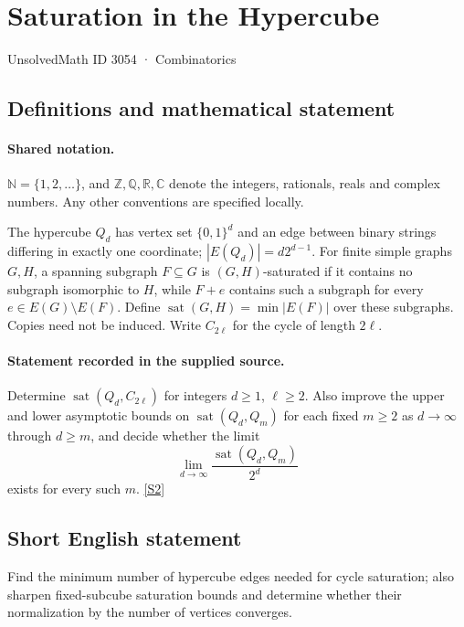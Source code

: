 \documentclass[11pt]{book}
\newcommand{\sref}[2]{\hyperlink{source:#1:#2}{[S#2]}}
\begin{document}
\setcounter{section}{3053}
\section{Saturation in the Hypercube}\label{3054}
{\small\sffamily UnsolvedMath ID 3054 · Combinatorics}
\subsection{Definitions and mathematical statement}

\paragraph{Shared notation.}$\mathbb N=\{1,2,\ldots\}$, and $\mathbb Z,\mathbb Q,\mathbb R,\mathbb C$ denote the integers, rationals, reals and complex numbers. Any other conventions are specified locally.


The hypercube $Q_d$ has vertex set $\{0,1\}^d$ and an edge between binary strings differing in exactly one coordinate; $|E(Q_d)|=d2^{d-1}$. For finite simple graphs $G,H$, a spanning subgraph $F\subseteq G$ is $(G,H)$-saturated if it contains no subgraph isomorphic to $H$, while $F+e$ contains such a subgraph for every $e\in E(G)\setminus E(F)$. Define $\operatorname{sat}(G,H)=\min |E(F)|$ over these subgraphs. Copies need not be induced. Write $C_{2\ell}$ for the cycle of length $2\ell$.
\paragraph{Statement recorded in the supplied source.}
Determine $\operatorname{sat}(Q_d,C_{2\ell})$ for integers $d\geq1$, $\ell\geq2$. Also improve the upper and lower asymptotic bounds on $\operatorname{sat}(Q_d,Q_m)$ for each fixed $m\geq2$ as $d\to\infty$ through $d\geq m$, and decide whether the limit
\[\lim_{d\to\infty}\frac{\operatorname{sat}(Q_d,Q_m)}{2^d}\]
exists for every such $m$. \sref{3054}{2}
\subsection{Short English statement}
Find the minimum number of hypercube edges needed for cycle saturation; also sharpen fixed-subcube saturation bounds and determine whether their normalization by the number of vertices converges.
\end{document}
